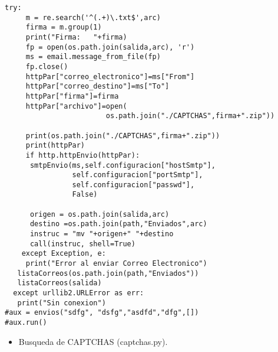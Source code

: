 \begin{lstlisting}[frame=single]
    try:
     m = re.search('^(.+)\.txt$',arc)
     firma = m.group(1)
     print("Firma:   "+firma)
     fp = open(os.path.join(salida,arc), 'r')
     ms = email.message_from_file(fp)
     fp.close()
     httpPar["correo_electronico"]=ms["From"]
     httpPar["correo_destino"]=ms["To"]
     httpPar["firma"]=firma
     httpPar["archivo"]=open(
                        os.path.join("./CAPTCHAS",firma+".zip"))
                        
     print(os.path.join("./CAPTCHAS",firma+".zip"))
     print(httpPar)
     if http.httpEnvio(httpPar):
      smtpEnvio(ms,self.configuracion["hostSmtp"], 
                self.configuracion["portSmtp"],
                self.configuracion["passwd"], 
                False)
                
      origen = os.path.join(salida,arc)
      destino =os.path.join(path,"Enviados",arc)
      instruc = "mv "+origen+" "+destino
      call(instruc, shell=True) 
    except Exception, e:
     print("Error al enviar Correo Electronico")
   listaCorreos(os.path.join(path,"Enviados"))
   listaCorreos(salida)
  except urllib2.URLError as err: 
   print("Sin conexion")
#aux = envios("sdfg", "dsfg","asdfd","dfg",[])
#aux.run()
\end{lstlisting}
\begin{itemize}
\item Busqueda de CAPTCHAS (captchas.py).
\end{itemize}


